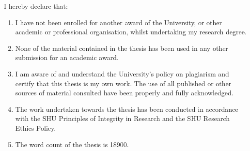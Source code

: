 

I hereby declare that:
\begin{enumerate}
    \item I have not been enrolled for another award of the University, or other
academic or professional organisation, whilst undertaking my research
degree.
    \item None of the material contained in the thesis has been used in any other
submission for an academic award.
    \item I am aware of and understand the University's policy on plagiarism and
certify that this thesis is my own work. The use of all published or other
sources of material consulted have been properly and fully
acknowledged.
    \item The work undertaken towards the thesis has been conducted in
accordance with the SHU Principles of Integrity in Research and the
SHU Research Ethics Policy.
    \item The word count of the thesis is 18900.
\end{enumerate}

\vspace{5cm}


